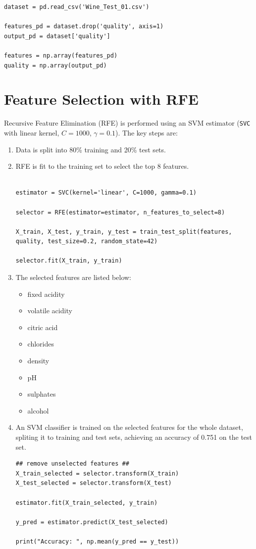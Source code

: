 \documentclass[12pt]{article}
\begin{document}
\begin{lstlisting}
dataset = pd.read_csv('Wine_Test_01.csv')

features_pd = dataset.drop('quality', axis=1) 
output_pd = dataset['quality']

features = np.array(features_pd)
quality = np.array(output_pd)
\end{lstlisting}

\section{Feature Selection with RFE}

Recursive Feature Elimination (RFE) is performed using an SVM estimator (\texttt{SVC} with linear kernel, $C=1000$, $\gamma=0.1$). The key steps are:
\begin{enumerate}
    \item Data is split into 80\% training and 20\% test sets.
    \item RFE is fit to the training set to select the top 8 features.
    \begin{lstlisting}

estimator = SVC(kernel='linear', C=1000, gamma=0.1)

selector = RFE(estimator=estimator, n_features_to_select=8) 

X_train, X_test, y_train, y_test = train_test_split(features, quality, test_size=0.2, random_state=42)

selector.fit(X_train, y_train)
    \end{lstlisting}
    \newpage
    \item The selected features are listed below:
    \begin{itemize}
        \item fixed acidity
        \item volatile acidity
        \item citric acid
        \item chlorides
        \item density
        \item pH
        \item sulphates
        \item alcohol
    \end{itemize}
    \item An SVM classifier is trained on the selected features for the whole dataset, spliting it to training and test sets, achieving an accuracy of 0.751 on the test set.
    \begin{lstlisting}
## remove unselected features ##
X_train_selected = selector.transform(X_train)
X_test_selected = selector.transform(X_test)

estimator.fit(X_train_selected, y_train)

y_pred = estimator.predict(X_test_selected)

print("Accuracy: ", np.mean(y_pred == y_test))
    \end{lstlisting}
\end{enumerate}
\end{document}
